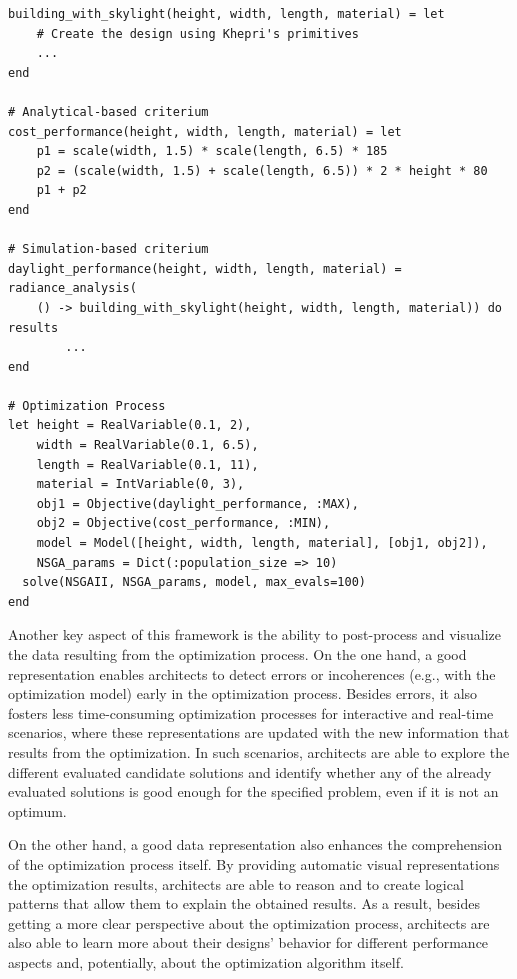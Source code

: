 \begin{lstlisting}[caption={BPO example of the framework's API using the Khepri AD tool.},label=BPOjuliaCode]	
building_with_skylight(height, width, length, material) = let
	# Create the design using Khepri's primitives
	...
end

# Analytical-based criterium
cost_performance(height, width, length, material) = let
	p1 = scale(width, 1.5) * scale(length, 6.5) * 185
	p2 = (scale(width, 1.5) + scale(length, 6.5)) * 2 * height * 80
	p1 + p2
end

# Simulation-based criterium
daylight_performance(height, width, length, material) = radiance_analysis(
	() -> building_with_skylight(height, width, length, material)) do results
		...
end

# Optimization Process
let height = RealVariable(0.1, 2),
	width = RealVariable(0.1, 6.5),
	length = RealVariable(0.1, 11),
	material = IntVariable(0, 3),
	obj1 = Objective(daylight_performance, :MAX),
	obj2 = Objective(cost_performance, :MIN),
	model = Model([height, width, length, material], [obj1, obj2]),
	NSGA_params = Dict(:population_size => 10)
  solve(NSGAII, NSGA_params, model, max_evals=100)
end
\end{lstlisting}


Another key aspect of this framework is the ability to post-process and visualize the data resulting from the optimization process. On the one hand, a good representation enables architects to detect errors or incoherences (e.g., with the optimization model) early in the optimization process. Besides errors, it also fosters less time-consuming optimization processes for interactive and real-time scenarios, where these representations are updated with the new information that results from the optimization. In such scenarios, architects are able to explore the different evaluated candidate solutions and identify whether any of the already evaluated solutions is good enough for the specified problem, even if it is not an optimum.

On the other hand, a good data representation also enhances the comprehension of the optimization process itself. By providing automatic visual representations the optimization results, architects are able to reason and to create logical patterns that allow them to explain the obtained results. As a result, besides getting a more clear perspective about the optimization process, architects are also able to learn more about their designs' behavior for different performance aspects and, potentially, about the optimization algorithm itself.
